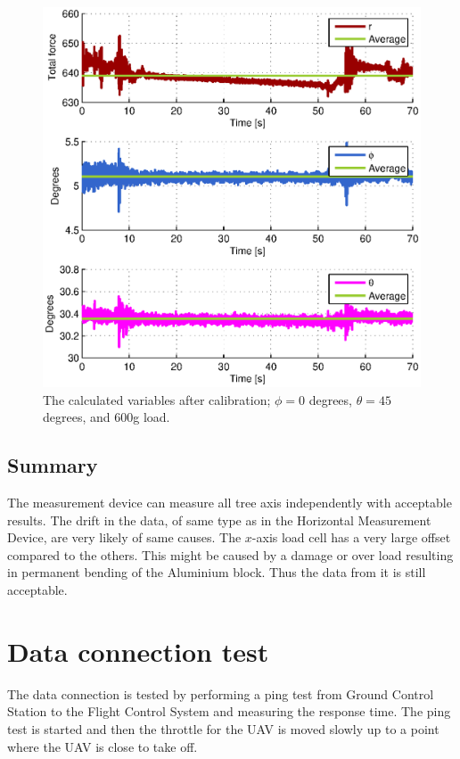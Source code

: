 \begin{figure}[hbtp]
\centering
\includegraphics[scale=1]{graphics/fcs_test/calib_result_compare_angles.eps}
\caption[The calculated variables, $\phi=0$, $\theta=45$, and 600g load.]{The calculated variables after calibration; $\phi=0$ degrees, $\theta=45$ degrees, and 600g load.}
\label{fig:calib_result_compare_angles}
\end{figure}


\newpage
\subsection{Summary}
The measurement device can measure all tree axis independently with acceptable results. The drift in the data, of same type as in the Horizontal Measurement Device, are very likely of same causes. The $x$-axis load cell has a very large offset compared to the others. This might be caused by a damage or over load resulting in permanent bending of the Aluminium block. Thus the data from it is still acceptable.



\newpage
\section{Data connection test}
The data connection is tested by performing a ping test from Ground Control Station to the Flight Control System and measuring the response time. The ping test is started and then the throttle for the UAV is moved slowly up to a point where the UAV is close to take off.

